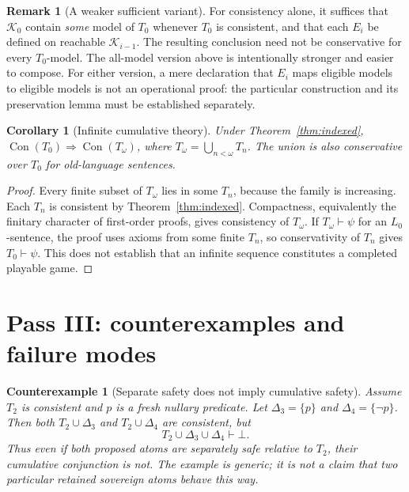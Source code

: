 \documentclass[11pt,letterpaper]{article}
\newtheorem{corollary}[theorem]{Corollary}
\newtheorem{counterexample}[theorem]{Counterexample}
\theoremstyle{definition}
\newtheorem{remark}[theorem]{Remark}
\newcommand{\Con}{\operatorname{Con}}
\begin{document}
\begin{remark}[A weaker sufficient variant]
For consistency alone, it suffices that \(\mathcal K_0\) contain \emph{some} model of \(T_0\) whenever \(T_0\) is consistent, and that each \(E_i\) be defined on reachable \(\mathcal K_{i-1}\). The resulting conclusion need not be conservative for every \(T_0\)-model. The all-model version above is intentionally stronger and easier to compose. For either version, a mere declaration that $E_i$ maps eligible models to eligible models is not an operational proof: the particular construction and its preservation lemma must be established separately.
\end{remark}

\begin{corollary}[Infinite cumulative theory]\label{cor:omega}
Under Theorem~\ref{thm:indexed}, \(\Con(T_0)\Rightarrow\Con(T_\omega)\), where \(T_\omega=\bigcup_{n<\omega}T_n\). The union is also conservative over $T_0$ for old-language sentences.
\end{corollary}
\begin{proof}
Every finite subset of \(T_\omega\) lies in some \(T_n\), because the family is increasing. Each \(T_n\) is consistent by Theorem~\ref{thm:indexed}. Compactness, equivalently the finitary character of first-order proofs, gives consistency of \(T_\omega\). If $T_\omega\vdash\psi$ for an $L_0$-sentence, the proof uses axioms from some finite $T_n$, so conservativity of $T_n$ gives $T_0\vdash\psi$. This does not establish that an infinite sequence constitutes a completed playable game.
\end{proof}

\section{Pass III: counterexamples and failure modes}

\begin{counterexample}[Separate safety does not imply cumulative safety]\label{cx:pn}
Assume \(T_2\) is consistent and \(p\) is a fresh nullary predicate. Let \(\Delta_3=\{p\}\) and \(\Delta_4=\{\neg p\}\). Then both \(T_2\cup\Delta_3\) and \(T_2\cup\Delta_4\) are consistent, but
\[
T_2\cup\Delta_3\cup\Delta_4\vdash\bot.
\]
Thus even if both proposed atoms are separately safe relative to \(T_2\), their cumulative conjunction is not. The example is generic; it is \emph{not} a claim that two particular retained sovereign atoms behave this way.
\end{counterexample}
\end{document}

